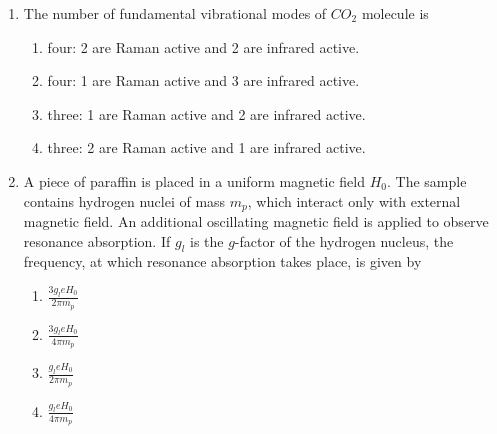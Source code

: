 \documentclass[journal]{IEEEtran}
\begin{document}
\begin{enumerate}
\item The number of fundamental vibrational modes of $CO_2$ molecule is 
\begin{enumerate}
    \item four: 2 are Raman active and 2 are infrared active.
    \item four: 1 are Raman active and 3 are infrared active.
    \item three: 1 are Raman active and 2 are infrared active.
    \item three: 2 are Raman active and 1 are infrared active.
\end{enumerate}
\item A piece of paraffin is placed in a uniform magnetic field $H_0$. The sample contains hydrogen nuclei of mass $m_p$, which interact only with external magnetic field. An additional oscillating magnetic field is applied to observe resonance absorption. If $g_l$ is the $g$-factor of the hydrogen nucleus, the frequency, at which resonance absorption takes place, is given by
\begin{multicols}{4}
    \begin{enumerate}
        \item $\frac{3g_leH_0}{2\pi m_p}$
        \item $\frac{3g_leH_0}{4\pi m_p}$
        \item $\frac{g_leH_0}{2\pi m_p}$
        \item $\frac{g_leH_0}{4\pi m_p}$
    \end{enumerate}
\end{multicols}
\end{enumerate}
\end{document}
